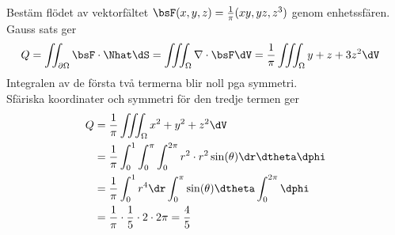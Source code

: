 Bestäm flödet av vektorfältet $\bsF(x, y, z) = \frac{1}{\pi} (xy, yz, z^3)$
genom enhetssfären.
Gauss sats ger
\begin{align*}
  Q = \iint_{\partial\Omega} \bsF \cdot \Nhat \dS
  &= \iiint_{\Omega} \nabla \cdot \bsF \dV
    = \frac{1}{\pi} \iiint_{\Omega} y + z + 3z^2 \dV
\end{align*}
Integralen av de första två termerna blir noll pga symmetri. \\
Sfäriska koordinater och symmetri för den tredje termen ger
\begin{align*}
  Q &= \frac{1}{\pi} \iiint_{\Omega} x^2 + y^2 + z^2 \dV \\
    &= \frac{1}{\pi} \int_0^1 \int_0^{\pi} \int_0^{2\pi} r^2 \cdot
      r^2\sin(\theta)\dr\dtheta\dphi \\
    &= \frac{1}{\pi} \int_0^1 r^4 \dr \int_0^{\pi} \sin(\theta)
      \dtheta \int_0^{2\pi} \dphi \\
    &= \frac{1}{\pi} \cdot \frac{1}{5} \cdot 2 \cdot 2\pi
     = \frac{4}{5}
\end{align*}
%